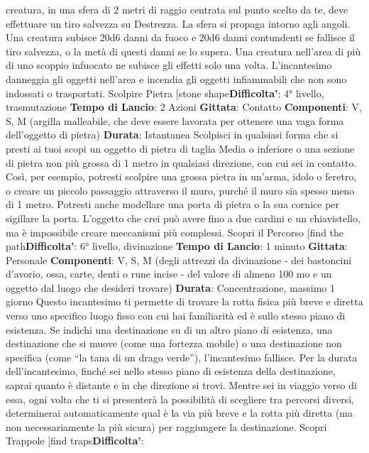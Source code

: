 \begin{multicols}{2}
creatura, in una sfera di 2 metri di raggio centrata sul
punto scelto da te, deve effettuare un tiro salvezza su
Destrezza. La sfera si propaga intorno agli angoli. Una
creatura subisce 20d6 danni da fuoco e 20d6 danni
contundenti se fallisce il tiro salvezza, o la metà di
questi danni se lo supera. Una creatura nell’area di più
di uno scoppio infuocato ne subisce gli effetti solo una
volta.
L’incantesimo danneggia gli oggetti nell’area e incendia
gli oggetti infiammabili che non sono indossati o
trasportati.
Scolpire Pietra
[stone shape\textbf{Difficolta'}:
4° livello, trasmutazione
\textbf{Tempo di Lancio}: 2 Azioni
\textbf{Gittata}: Contatto
\textbf{Componenti}: V, S, M (argilla malleabile, che deve
essere lavorata per ottenere una vaga forma
dell’oggetto di pietra)
\textbf{Durata}: Istantanea
Scolpisci in qualsiasi forma che si presti ai tuoi scopi un
oggetto di pietra di taglia Media o inferiore o una
sezione di pietra non più grossa di 1 metro in qualsiasi
direzione, con cui sei in contatto.
Così, per esempio, potresti scolpire una grossa pietra in
un’arma, idolo o feretro, o creare un piccolo passaggio
attraverso il muro, purché il muro sia spesso meno di
1 metro. Potresti anche modellare una porta di pietra o
la sua cornice per sigillare la porta. L’oggetto che crei
può avere fino a due cardini e un chiavistello, ma è
impossibile creare meccanismi più complessi.
Scopri il Percorso
[find the path\textbf{Difficolta'}:
6° livello, divinazione
\textbf{Tempo di Lancio}: 1 minuto
\textbf{Gittata}: Personale
\textbf{Componenti}: V, S, M (degli attrezzi da divinazione -
dei bastoncini d’avorio, ossa, carte, denti o rune incise -
del valore di almeno 100 mo e un oggetto dal luogo che
desideri trovare)
\textbf{Durata}: Concentrazione, massimo 1 giorno
Questo incantesimo ti permette di trovare la rotta fisica
più breve e diretta verso uno specifico luogo fisso con
cui hai familiarità ed è sullo stesso piano di esistenza.
Se indichi una destinazione su di un altro piano di
esistenza, una destinazione che si muove (come una 
fortezza mobile) o una destinazione non specifica
(come “la tana di un drago verde”), l’incantesimo
fallisce.
Per la durata dell’incantesimo, finché sei nello stesso
piano di esistenza della destinazione, saprai quanto è
distante e in che direzione si trovi. Mentre sei in viaggio
verso di essa, ogni volta che ti si presenterà la
possibilità di scegliere tra percorsi diversi, determinerai
automaticamente qual è la via più breve e la rotta più
diretta (ma non necessariamente la più sicura) per
raggiungere la destinazione.
Scopri Trappole
[find traps\textbf{Difficolta'}:

\end{multicols}
